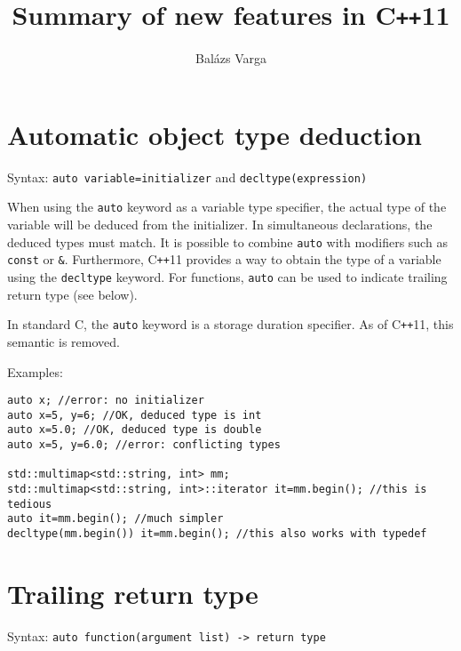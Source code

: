\documentclass[12pt,a4paper]{article}
\title{Summary of new features in C\texttt{++}11\vspace{-2ex}}
\author{Bal\'{a}zs Varga}
\date{\vspace{-5ex}}
\begin{document}
\maketitle


\section{Automatic object type deduction}

Syntax: \lstinline[style=CPP_CODE]|auto variable=initializer| and \lstinline[style=CPP_CODE]|decltype(expression)|

When using the \lstinline[style=CPP_CODE]{auto} keyword as a variable type specifier, the actual type of the variable will be deduced from the initializer. In simultaneous declarations, the deduced types must match. It is possible to combine \lstinline[style=CPP_CODE]{auto} with modifiers such as \lstinline[style=CPP_CODE]{const} or \lstinline[language=none]{&}. Furthermore, C\texttt{++}11 provides a way to obtain the type of a variable using the \lstinline[style=CPP_CODE]{decltype} keyword. For functions, \lstinline[style=CPP_CODE]{auto} can be used to indicate trailing return type (see below).

In standard C, the \lstinline[style=CPP_CODE]{auto} keyword is a storage duration specifier. As of C\texttt{++}11, this semantic is removed.

Examples:
\vspace{10pt}
\lstset{style=CPP_CODE}
\begin{lstlisting}
auto x; //error: no initializer
auto x=5, y=6; //OK, deduced type is int
auto x=5.0; //OK, deduced type is double
auto x=5, y=6.0; //error: conflicting types

std::multimap<std::string, int> mm;
std::multimap<std::string, int>::iterator it=mm.begin(); //this is tedious
auto it=mm.begin(); //much simpler
decltype(mm.begin()) it=mm.begin(); //this also works with typedef
\end{lstlisting}


\section{Trailing return type}

Syntax: \lstinline[style=CPP_CODE]|auto|\lstinline[language=none]| function(argument list) -> return type|
\end{document}
